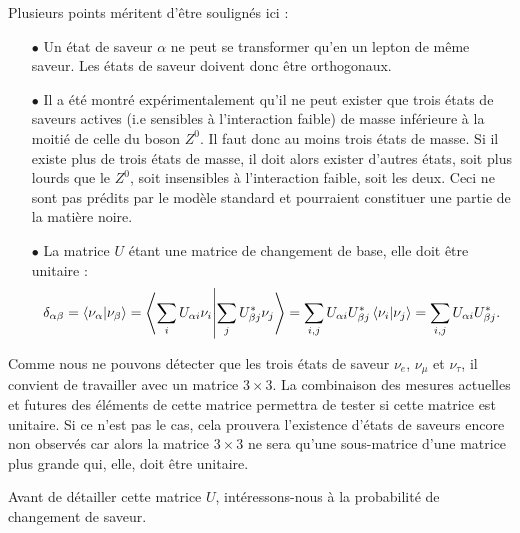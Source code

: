             Plusieurs points méritent d'être soulignés ici :
            \begin{itemize}
                \item[$\bullet$] Un état de saveur $\alpha$ ne peut se transformer qu'en un lepton de même saveur. Les états de saveur doivent donc être orthogonaux.
                \item[$\bullet$] Il a été montré expérimentalement qu'il ne peut exister que trois états de saveurs actives (i.e sensibles à l'interaction faible)\cite{pdg2018} de masse inférieure à la moitié de celle du boson $Z^0$. Il faut donc au moins trois états de masse. Si il existe plus de trois états de masse, il doit alors exister d'autres états, soit plus lourds que le $Z^0$, soit insensibles à l'interaction faible, soit les deux. Ceci ne sont pas prédits par le modèle standard et pourraient constituer une partie de la matière noire.
                \item[$\bullet$] La matrice $U$ étant une matrice de changement de base, elle doit être unitaire :
                \begin{equation*}
                    \delta_{\alpha\beta} = \braket{\nu_{\alpha}}{\nu_{\beta}} = \braket{\sum_i U_{\alpha i}\nu_i}{\sum_j U_{\beta j}^*\nu_j} = \sum_{i,j} U_{\alpha i}U_{\beta j}^* \braket{\nu_i}{\nu_j} = \sum_{i,j} U_{\alpha i}U_{\beta j}^*.
                \end{equation*}
            \end{itemize}
            Comme nous ne pouvons détecter que les trois états de saveur $\nu_e$, $\nu_{\mu}$ et $\nu_{\tau}$, il convient de travailler avec un matrice $3\times3$. La combinaison des mesures actuelles et futures des éléments de cette matrice\cite{Qian2013} permettra de tester si cette matrice est unitaire. Si ce n'est pas le cas, cela prouvera l'existence d'états de saveurs encore non observés car alors la matrice $3\times3$ ne sera qu'une sous-matrice d'une matrice plus grande qui, elle, doit être unitaire.
            
            Avant de détailler cette matrice $U$, intéressons-nous à la probabilité de changement de saveur.
             
